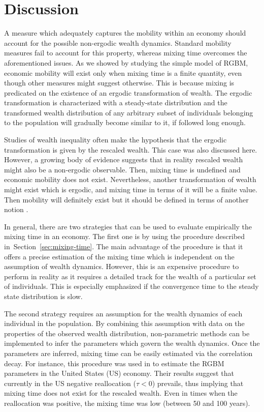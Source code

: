 \documentclass[11pt]{article}
\newcommand{\Sref}[1]{Section~\ref{sec:#1}}
\numberwithin{equation}{section}
\begin{document}
\section{Discussion} \label{sec:discussion}

A measure which adequately captures the mobility within an economy should account for the possible non-ergodic wealth dynamics. Standard mobility measures fail to account for this property, whereas mixing time overcomes the aforementioned issues. As we showed by studying the simple model of RGBM, economic mobility will exist only when mixing time is a finite quantity, even though other measures might suggest otherwise. This is because mixing is predicated on the existence of an ergodic transformation of wealth. The ergodic transformation is characterized with a steady-state distribution and the transformed wealth distribution of any arbitrary subset of individuals belonging to the population will gradually become similar to it, if followed long enough.

Studies of wealth inequality often make the hypothesis that the ergodic transformation is given by the rescaled wealth. This case was also discussed here. However, a growing body of evidence suggests that in reality rescaled wealth might also be a non-ergodic observable. Then, mixing time is undefined and economic mobility does not exist. Nevertheless, another transformation of wealth might exist which is ergodic, and mixing time in terms of it will be a finite value. Then mobility will definitely exist but it should be defined in terms of another notion \citep{JanttiJenkins2015}.

In general, there are two strategies that can be used to evaluate empirically the mixing time in an economy. The first one is by using the procedure described in~\Sref{mixing-time}. The main advantage of the procedure is that it offers a precise estimation of the mixing time which is independent on the assumption of wealth dynamics. However, this is an expensive procedure to perform in reality as it requires a detailed track for the wealth of a particular set of individuals. This is especially emphasized if the convergence time to the steady state distribution is slow.

The second strategy requires an assumption for the wealth dynamics of each individual in the population. By combining this assumption with data on the properties of the observed wealth distribution, non-parametric methods can be implemented to infer the parameters which govern the wealth dynamics. Once the parameters are inferred, mixing time can be easily estimated via the correlation decay. For instance, this procedure was used in \citet{BermanPetersAdamou2019} to estimate the RGBM parameters in the United States (US) economy. Their results suggest that currently in the US  negative reallocation ($\tau < 0$) prevails, thus implying that mixing time does not exist for the rescaled wealth. Even in times when the reallocation was positive, the mixing time was low (between 50 and 100 years).  
\end{document}
